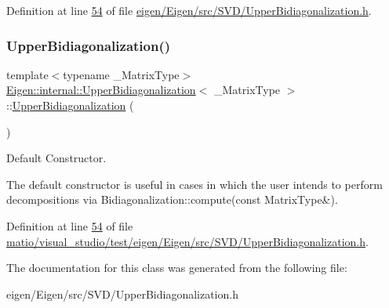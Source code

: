 Definition at line \hyperlink{eigen_2_eigen_2src_2_s_v_d_2_upper_bidiagonalization_8h_source_l00054}{54} of file \hyperlink{eigen_2_eigen_2src_2_s_v_d_2_upper_bidiagonalization_8h_source}{eigen/\+Eigen/src/\+S\+V\+D/\+Upper\+Bidiagonalization.\+h}.

\mbox{\label{class_eigen_1_1internal_1_1_upper_bidiagonalization_aa37a7ca5f5e86e3efbc6907d03d89340}} 
\subsubsection{\texorpdfstring{Upper\+Bidiagonalization()}{UpperBidiagonalization()}\hspace{0.1cm}{\footnotesize\ttfamily [2/2]}}
{\footnotesize\ttfamily template$<$typename \+\_\+\+Matrix\+Type$>$ \\
\hyperlink{class_eigen_1_1internal_1_1_upper_bidiagonalization}{Eigen\+::internal\+::\+Upper\+Bidiagonalization}$<$ \+\_\+\+Matrix\+Type $>$\+::\hyperlink{class_eigen_1_1internal_1_1_upper_bidiagonalization}{Upper\+Bidiagonalization} (\begin{DoxyParamCaption}{ }\end{DoxyParamCaption})\hspace{0.3cm}{\ttfamily [inline]}}



Default Constructor. 

The default constructor is useful in cases in which the user intends to perform decompositions via Bidiagonalization\+::compute(const Matrix\+Type\&). 

Definition at line \hyperlink{matio_2visual__studio_2test_2eigen_2_eigen_2src_2_s_v_d_2_upper_bidiagonalization_8h_source_l00054}{54} of file \hyperlink{matio_2visual__studio_2test_2eigen_2_eigen_2src_2_s_v_d_2_upper_bidiagonalization_8h_source}{matio/visual\+\_\+studio/test/eigen/\+Eigen/src/\+S\+V\+D/\+Upper\+Bidiagonalization.\+h}.



The documentation for this class was generated from the following file\+:\begin{DoxyCompactItemize}
\item 
eigen/\+Eigen/src/\+S\+V\+D/\+Upper\+Bidiagonalization.\+h\end{DoxyCompactItemize}
